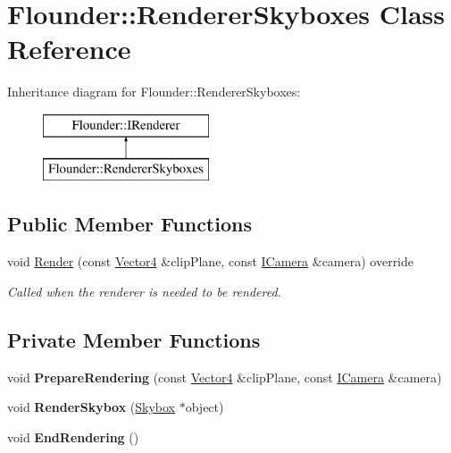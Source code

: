 \hypertarget{class_flounder_1_1_renderer_skyboxes}{}\section{Flounder\+:\+:Renderer\+Skyboxes Class Reference}
\label{class_flounder_1_1_renderer_skyboxes}
Inheritance diagram for Flounder\+:\+:Renderer\+Skyboxes\+:\begin{figure}[H]
\begin{center}
\leavevmode
\includegraphics[height=2.000000cm]{class_flounder_1_1_renderer_skyboxes}
\end{center}
\end{figure}
\subsection*{Public Member Functions}
\begin{DoxyCompactItemize}
\item 
void \hyperlink{class_flounder_1_1_renderer_skyboxes_a27115faed1ab81350a8f718203f3c4bd}{Render} (const \hyperlink{class_flounder_1_1_vector4}{Vector4} \&clip\+Plane, const \hyperlink{class_flounder_1_1_i_camera}{I\+Camera} \&camera) override
\begin{DoxyCompactList}\small\item\em Called when the renderer is needed to be rendered. \end{DoxyCompactList}\end{DoxyCompactItemize}
\subsection*{Private Member Functions}
\begin{DoxyCompactItemize}
\item 
\mbox{\label{class_flounder_1_1_renderer_skyboxes_a9e9da1f76acb90e30646542d9004f259}} 
void {\bfseries Prepare\+Rendering} (const \hyperlink{class_flounder_1_1_vector4}{Vector4} \&clip\+Plane, const \hyperlink{class_flounder_1_1_i_camera}{I\+Camera} \&camera)
\item 
\mbox{\label{class_flounder_1_1_renderer_skyboxes_af740cb1476e15878f8d10869825bc840}} 
void {\bfseries Render\+Skybox} (\hyperlink{class_flounder_1_1_skybox}{Skybox} $\ast$object)
\item 
\mbox{\label{class_flounder_1_1_renderer_skyboxes_a83fbd50d2f0bebb049cc7fdaec623160}} 
void {\bfseries End\+Rendering} ()
\end{DoxyCompactItemize}
